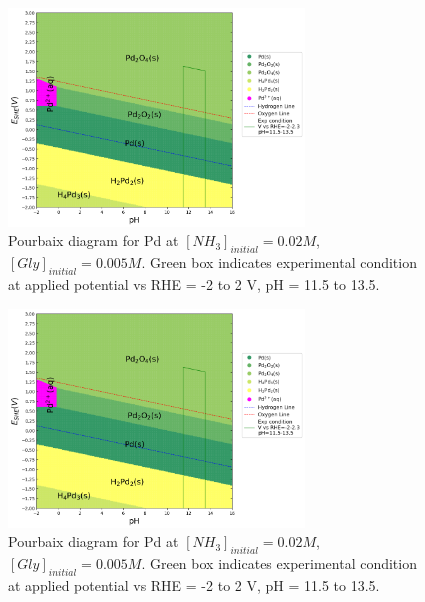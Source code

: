 \documentclass[journal=jacsat,manuscript=article,email=false]{achemso}
\begin{document}
\begin{figure}[htbp]
    \centering
    \includegraphics[width=0.7\textwidth]{Figures/pourbaix_diagrams/Pd-NH3-H2O_activity=1e-04_[NH3]=0M_[Gly]=0M_[CN]=0.png}
    \caption{Pourbaix diagram for Pd at $[NH_3]_{initial}= 0.02M$, $[Gly]_{initial}=0.005M$. Green box indicates experimental condition at applied potential vs RHE = -2 to 2 V, pH = 11.5 to 13.5.}
    \label{fig:Pd_Pourbaix_NH3_Gly_SI}
\end{figure}
\begin{figure}[htbp]
    \centering
    \includegraphics[width=0.7\textwidth]{Figures/pourbaix_diagrams/Pd-NH3-H2O_activity=1e-04_[NH3]=0.02M_[Gly]=0.005M_[CN]=0.png}
    \caption{Pourbaix diagram for Pd at $[NH_3]_{initial}= 0.02M$, $[Gly]_{initial}=0.005M$. Green box indicates experimental condition at applied potential vs RHE = -2 to 2 V, pH = 11.5 to 13.5.}
    \label{fig:Pd_Pourbaix_NH3_Gly_SI}
\end{figure}
\end{document}
